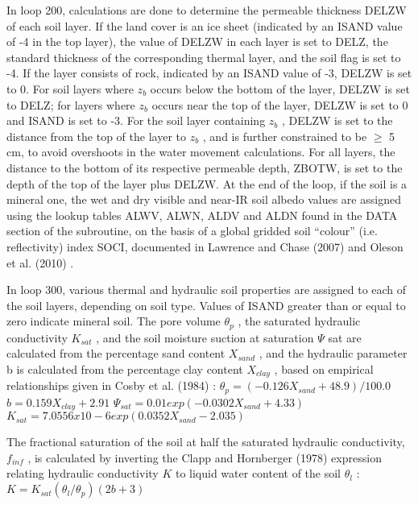 In loop 200, calculations are done to determine the permeable thickness D\+E\+L\+Z\+W of each soil layer. If the land cover is an ice sheet (indicated by an I\+S\+A\+N\+D value of -\/4 in the top layer), the value of D\+E\+L\+Z\+W in each layer is set to D\+E\+L\+Z, the standard thickness of the corresponding thermal layer, and the soil flag is set to -\/4. If the layer consists of rock, indicated by an I\+S\+A\+N\+D value of -\/3, D\+E\+L\+Z\+W is set to 0. For soil layers where $z_b$ occurs below the bottom of the layer, D\+E\+L\+Z\+W is set to D\+E\+L\+Z; for layers where $z_b$ occurs near the top of the layer, D\+E\+L\+Z\+W is set to 0 and I\+S\+A\+N\+D is set to -\/3. For the soil layer containing $z_b$ , D\+E\+L\+Z\+W is set to the distance from the top of the layer to $z_b$ , and is further constrained to be $\geq$ 5 cm, to avoid overshoots in the water movement calculations. For all layers, the distance to the bottom of its respective permeable depth, Z\+B\+O\+T\+W, is set to the depth of the top of the layer plus D\+E\+L\+Z\+W. At the end of the loop, if the soil is a mineral one, the wet and dry visible and near-\/\+I\+R soil albedo values are assigned using the lookup tables A\+L\+W\+V, A\+L\+W\+N, A\+L\+D\+V and A\+L\+D\+N found in the D\+A\+T\+A section of the subroutine, on the basis of a global gridded soil “colour” (i.\+e. reflectivity) index S\+O\+C\+I, documented in Lawrence and Chase (2007) \cite{Lawrence2007-bc} and Oleson et al. (2010) \cite{Oleson2010-c88}.

In loop 300, various thermal and hydraulic soil properties are assigned to each of the soil layers, depending on soil type. Values of I\+S\+A\+N\+D greater than or equal to zero indicate mineral soil. The pore volume $\theta_p$ , the saturated hydraulic conductivity $K_{sat}$ , and the soil moisture suction at saturation $\Psi$ sat are calculated from the percentage sand content $X_{sand}$ , and the hydraulic parameter b is calculated from the percentage clay content $X_{clay}$ , based on empirical relationships given in Cosby et al. (1984) \cite{Cosby1984-jc} \+: $\theta_p = (-0.126 X_{sand} +48.9)/100.0$ $b = 0.159 X_{clay} + 2.91$ $\Psi_{sat} = 0.01 exp(-0.0302 X_{sand} + 4.33)$ $K_{sat} = 7.0556 x 10 -6 exp(0.0352 X_{sand} - 2.035)$

The fractional saturation of the soil at half the saturated hydraulic conductivity, $f_{inf}$ , is calculated by inverting the Clapp and Hornberger (1978) \cite{Clapp1978-898} expression relating hydraulic conductivity $K$ to liquid water content of the soil $\theta_l$ \+: $K = K_{sat} (\theta_l / \theta_p ) (2b + 3)$

